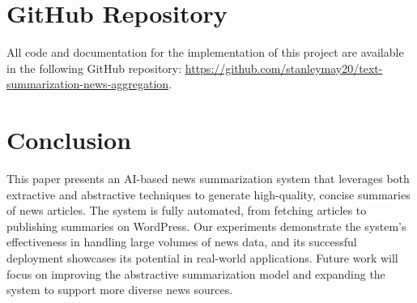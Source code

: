 \documentclass[12pt]{article}
\begin{document}
\section{GitHub Repository}
All code and documentation for the implementation of this project are available in the following GitHub repository:
\href{https://github.com/stanleymay20/text-summarization-news-aggregation}{https://github.com/stanleymay20/text-summarization-news-aggregation}.

\section{Conclusion}
This paper presents an AI-based news summarization system that leverages both extractive and abstractive techniques to generate high-quality, concise summaries of news articles. The system is fully automated, from fetching articles to publishing summaries on WordPress. Our experiments demonstrate the system's effectiveness in handling large volumes of news data, and its successful deployment showcases its potential in real-world applications. Future work will focus on improving the abstractive summarization model and expanding the system to support more diverse news sources.


\end{document}
